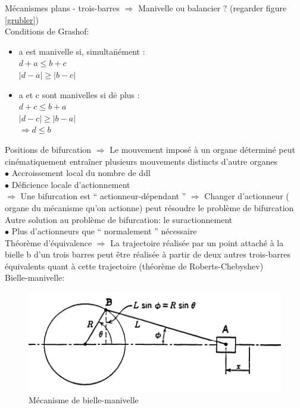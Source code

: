 Mécanismes plans - trois-barres $\Rightarrow$ Manivelle ou balancier ? (regarder figure \ref{grubler})\\
Conditions de Grashof:\\
\begin{itemize}
\renewcommand{\labelitemi}{$\bullet$}
\item{\begin{tabbing}
a est manivelle si, simulta\=nément :\\
\> $d+a\leq b+c$\\
\> $|d-a|\geq|b-c|$\\
\end{tabbing}}
\item{\begin{tabbing}
a et c sont manivelles si d\=e plus :\\
\> $d+c\leq b+a$\\
\> $|d-c|\geq|b-a|$\\
\> $\Rightarrow d\leq b$\\
\end{tabbing}}
\end{itemize}

{\color{orange}Positions de bifurcation} $\Rightarrow$ Le mouvement imposé à un organe déterminé peut {\color{orange}cinématiquement} entraîner {\color{orange}plusieurs mouvements distincts} d’autre organes\\
$\bullet$ Accroissement local du nombre de ddl\\
$\bullet$ Déficience locale d’actionnement\\
$\Rightarrow$ Une bifurcation est “ actionneur-dépendant ” $\Rightarrow$ Changer d'actionneur ( organe du mécanisme qu'on actionne) peut résoudre le problème de bifurcation\\

Autre solution au problème de bifurcation: le suractionnement\\
$\bullet$ Plus d'actionneurs que “ normalement ” nécessaire\\

{\color{orange}Théorème d’équivalence} $\Rightarrow$ La trajectoire réalisée par un point attaché à la bielle b d’un trois barres peut être réalisée à partir de deux autres trois-barres équivalents quant à cette trajectoire (théorème de Roberts-Chebyshev)\\

Bielle-manivelle:

\begin{figure}[H]
\centering
\includegraphics[width=.8\linewidth]{biellemanivelle.png}
\caption{Mécanisme de bielle-manivelle}
\label{manivelle}
\end{figure}

